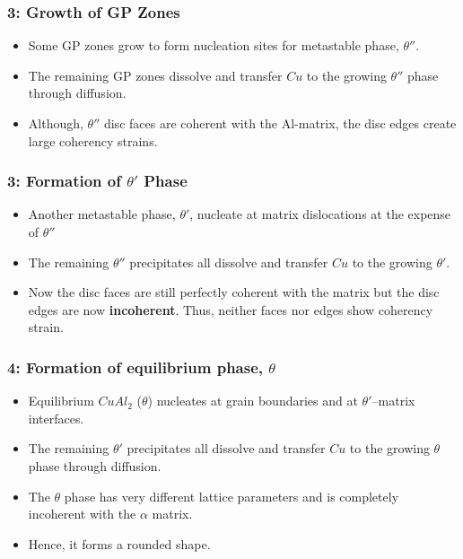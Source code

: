 
\subsubsection{3: Growth of GP Zones} %
\label{ssub:growth_of_gp_zones}


\begin{itemize}
  \item Some GP zones grow to form nucleation sites for metastable phase, $\theta''$.
  \item The remaining GP zones dissolve and transfer $Cu$ to the growing $\theta''$ phase through diffusion.
  \item Although, $\theta''$ disc faces are coherent with the Al-matrix, the disc edges create large coherency strains.
\end{itemize}


\subsubsection{3: Formation of $\theta'$ Phase} %
\label{ssub:formation_of_thata}


\begin{itemize}
  \item Another metastable phase, $\theta'$, nucleate at matrix dislocations at the expense of $\theta''$
  \item The  remaining $\theta''$ precipitates all dissolve and transfer $Cu$ to the growing  $\theta'$.
  \item Now the disc faces are still perfectly coherent with the matrix but the disc edges are now \textbf{incoherent}. Thus, neither faces nor edges show coherency strain.
\end{itemize}


\subsubsection{4: Formation of equilibrium phase, $\theta$} %
\label{ssub:formation_of_equilibrium_phase_}


\begin{itemize}
  \item Equilibrium $CuAl_2$ ($\theta$) nucleates at grain boundaries and at  $\theta'$–matrix interfaces.
  \item The  remaining $\theta'$ precipitates all dissolve and transfer $Cu$ to the growing $\theta$ phase through diffusion.
  \item The $\theta$ phase has very different lattice parameters and is completely incoherent with the $\alpha$ matrix.
  \item Hence, it forms a rounded shape.
\end{itemize}



